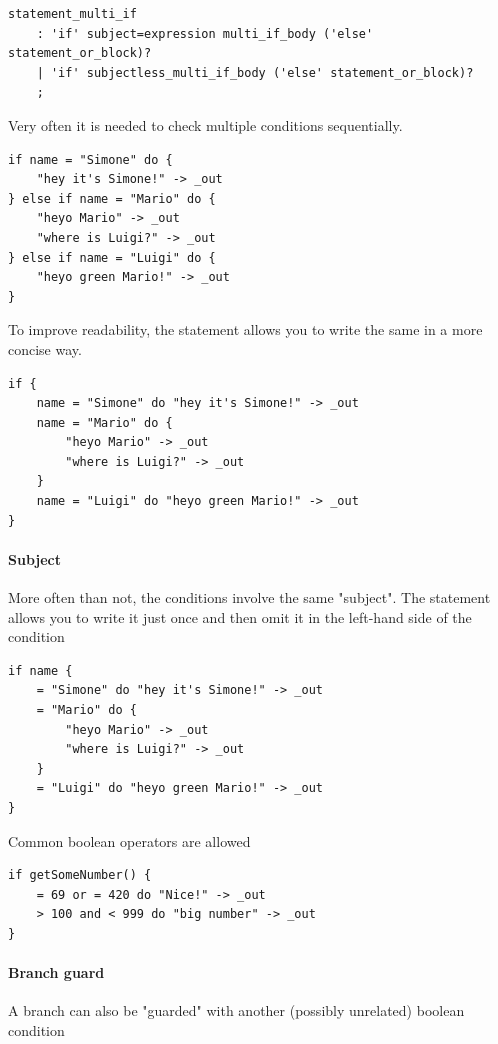 \begin{verbatim}
statement_multi_if
	: 'if' subject=expression multi_if_body ('else' statement_or_block)?
	| 'if' subjectless_multi_if_body ('else' statement_or_block)?
	;
\end{verbatim}

Very often it is needed to check multiple conditions sequentially.

\begin{verbatim}
if name = "Simone" do {
	"hey it's Simone!" -> _out
} else if name = "Mario" do {
	"heyo Mario" -> _out
	"where is Luigi?" -> _out
} else if name = "Luigi" do {
	"heyo green Mario!" -> _out
}
\end{verbatim}

To improve readability, the  statement allows you to write the same in
a more concise way.

\begin{verbatim}
if {
	name = "Simone" do "hey it's Simone!" -> _out
	name = "Mario" do {
		"heyo Mario" -> _out
		"where is Luigi?" -> _out
	}
	name = "Luigi" do "heyo green Mario!" -> _out
}
\end{verbatim}


\paragraph{Subject} More often than not, the conditions involve the same
"subject". The  statement allows you to write it just once and then
omit it in the left-hand side of the condition

\begin{verbatim}
if name {
	= "Simone" do "hey it's Simone!" -> _out
	= "Mario" do {
		"heyo Mario" -> _out
		"where is Luigi?" -> _out
	}
	= "Luigi" do "heyo green Mario!" -> _out
}
\end{verbatim}

Common boolean operators are allowed

\begin{verbatim}
if getSomeNumber() {
	= 69 or = 420 do "Nice!" -> _out
	> 100 and < 999 do "big number" -> _out
}
\end{verbatim}

\paragraph{Branch guard} A branch can also be "guarded" with another (possibly
unrelated) boolean condition

